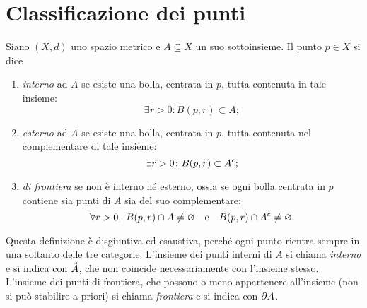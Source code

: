 \section{Classificazione dei punti}
\begin{definizione}
Siano $(X,d)$ uno spazio metrico e $A\subseteq X$ un suo sottoinsieme. Il punto $p\in X$ si dice
\begin{enumerate}
\item \emph{interno} ad $A$ se esiste una bolla, centrata in $p$, tutta contenuta in tale insieme:
\[
	\exists r>0\colon B(p,r)\subset A;
\]
\item \emph{esterno} ad $A$ se esiste una bolla, centrata in $p$, tutta contenuta nel complementare di tale insieme:
\[
	\exists r>0\colon B(p,r)\subset{A}^c;
\]
\item \emph{di frontiera} se non è interno né esterno, ossia se ogni bolla centrata in $p$ contiene sia punti di $A$ sia del suo complementare:
\[
	\forall r>0,\ B(p,r)\cap A\neq\emptyset\qtext{e}B(p,r)\cap\compl{A}\neq\emptyset.
\]
\end{enumerate}
\end{definizione}
Questa definizione è disgiuntiva ed esaustiva, perché ogni punto rientra sempre in una soltanto delle tre categorie.
L'insieme dei punti interni di $A$ si chiama \emph{interno} e si indica con $\mathring{A}$, che non coincide necessariamente con l'insieme stesso. L'insieme dei punti di frontiera, che possono o meno appartenere all'insieme (non si può stabilire a priori) si chiama \emph{frontiera} e si indica con $\partial A$.
